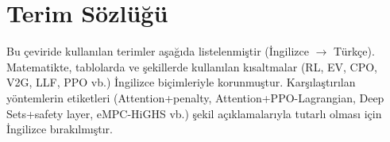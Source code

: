 \clearpage
\section*{Terim Sözlüğü}

Bu çeviride kullanılan terimler aşağıda listelenmiştir (İngilizce $\rightarrow$ Türkçe).
Matematikte, tablolarda ve şekillerde kullanılan kısaltmalar (RL, EV, CPO, V2G, LLF, PPO vb.) İngilizce biçimleriyle korunmuştur.
Karşılaştırılan yöntemlerin etiketleri (Attention+penalty, Attention+PPO-Lagrangian, Deep Sets+safety layer, eMPC-HiGHS vb.) şekil açıklamalarıyla tutarlı olması için İngilizce bırakılmıştır.

